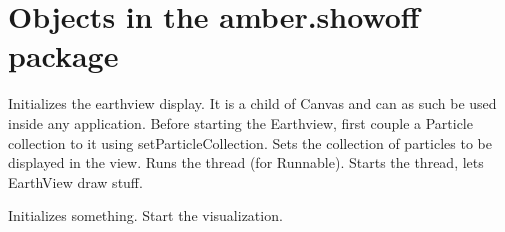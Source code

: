 \section{Objects in the amber.showoff package}



\begin{classmetadata}
\end{classmetadata}

\begin{interface}
    {Initializes the earthview display. It is a child of Canvas and can as such
    be used inside any application. Before starting the Earthview, first couple
    a Particle collection to it using setParticleCollection.}
    {Sets the collection of particles to be displayed in the view.}
    {Runs the thread (for Runnable).}
    {Starts the thread, lets EarthView draw stuff.}
\end{interface}




\begin{classmetadata}
\end{classmetadata}

\begin{interface}
    {Initializes something.}
    {Start the visualization.}
\end{interface}




\begin{classmetadata}
\end{classmetadata}

